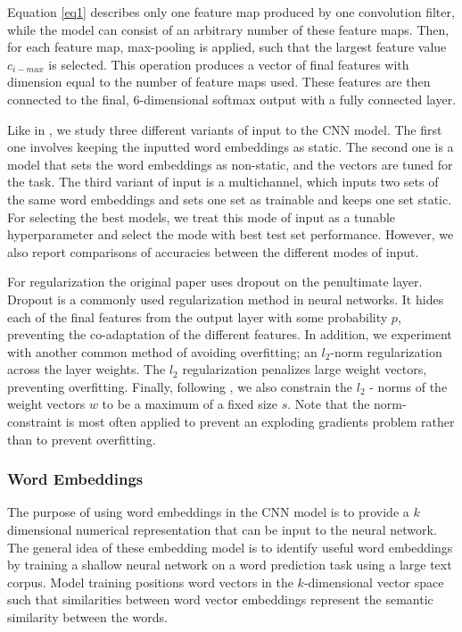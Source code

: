 \documentclass[conference]{IEEEtran}
\begin{document}
Equation \eqref{eq1} describes only one feature map produced by one convolution filter, while the model can consist of an arbitrary number of these feature maps. Then, for each feature map, max-pooling is applied, such that the largest feature value $c_{i-max}$ is selected. This operation produces a vector of final features with dimension equal to the number of feature maps used. These features are then connected to the final, 6-dimensional softmax output with a fully connected layer.

Like in \cite{kim-2014-convolutional}, we study three different variants of input to the CNN model. The first one involves keeping the inputted word embeddings as static. The second one is a model that sets the word embeddings as non-static, and the vectors are tuned for the task. The third variant of input is a multichannel, which inputs two sets of the same word embeddings and sets one set as trainable and keeps one set static. For selecting the best models, we treat this mode of input as a tunable hyperparameter and select the mode with best test set performance. However, we also report comparisons of accuracies between the different modes of input.

For regularization the original paper uses dropout on the penultimate layer. Dropout is a commonly used regularization method in neural networks. It hides each of the final features from the output layer with some probability $p$, preventing the co-adaptation of the different features. In addition, we experiment with another common method of avoiding overfitting; an $l_2$-norm regularization across the layer weights. The $l_2$ regularization penalizes large weight vectors, preventing overfitting.  Finally, following \cite{kim-2014-convolutional}, we also constrain the $l_2$ - norms of the weight vectors $w$ to be a maximum of a fixed size $s$. Note that the norm-constraint is most often applied to prevent an exploding gradients problem rather than to prevent overfitting.

\subsubsection{Word Embeddings}
The purpose of using word embeddings in the CNN model is to provide a $k$ dimensional numerical representation that can be input to the neural network. The general idea of these embedding model is to identify useful word embeddings by training a shallow neural network on a word prediction task using a large text corpus. Model training positions word vectors in the $k$-dimensional vector space such that similarities between word vector embeddings represent the semantic similarity between the words.
\end{document}
